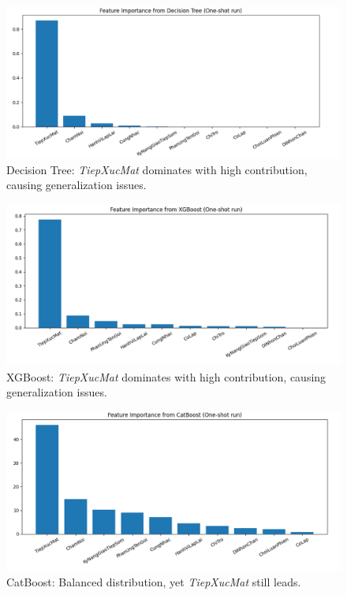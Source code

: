 \documentclass[conference]{IEEEtran}
\begin{document}
\begin{figure}[H]
    \centering
    \includegraphics[width=0.9\linewidth]{images/feature_dt.png}
    \caption{Decision Tree: \textit{TiepXucMat} dominates with high contribution, causing generalization issues.}
    \label{fig:x1}
    \end{figure}
\begin{figure}[H]
    \centering
    \includegraphics[width=0.9\linewidth]{images/feature_xgb.png}
    \caption{XGBoost: \textit{TiepXucMat} dominates with high contribution, causing generalization issues.}
    \label{fig:x2}
    \end{figure}
\begin{figure}[H]
    \centering
    \includegraphics[width=0.9\linewidth]{images/feature_cat.png}
    \caption{CatBoost: Balanced distribution, yet \textit{TiepXucMat} still leads.}
    \label{fig:x3}
    \end{figure}
\end{document}
